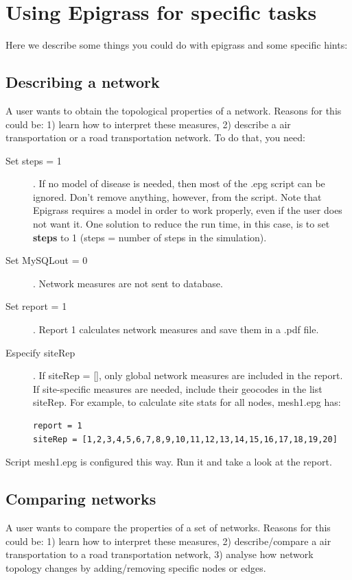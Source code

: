 \section{Using Epigrass for specific tasks}

Here we describe some things you could do with epigrass and some specific hints:

\subsection{Describing a network}
A user wants to obtain the topological properties of a network. Reasons for this could be: 1) learn how to interpret these measures, 2) describe a air transportation or a road transportation network. To do that, you need:

\begin{description}
\item[Set steps = 1]. If no model of disease is needed, then most of the .epg script can be ignored. Don't remove anything, however, from the script.  Note that Epigrass requires a model in order to work properly, even if the user does not want it. One solution to reduce the run time, in this case, is to set \textbf{steps} to 1 (steps = number of steps in the simulation).
\item[Set MySQLout = 0]. Network measures are not sent to database.
\item[Set report = 1]. Report 1 calculates network measures and save them in a .pdf file.
\item[Especify siteRep]. If siteRep = [], only global network measures are included in the report. If site-specific measures are needed, include their geocodes in the list siteRep. For example, to calculate site stats for all nodes, mesh1.epg has:
\begin{verbatim}
report = 1
siteRep = [1,2,3,4,5,6,7,8,9,10,11,12,13,14,15,16,17,18,19,20]
\end{verbatim}
\end{description}

Script mesh1.epg is configured this way. Run it and take a look at the report. 


\subsection{Comparing networks}
A user wants to compare the properties of a set of networks. Reasons for this could be: 1) learn how to interpret these measures, 2) describe/compare a air transportation to a road transportation network, 3) analyse how network topology changes by adding/removing specific nodes or edges.

